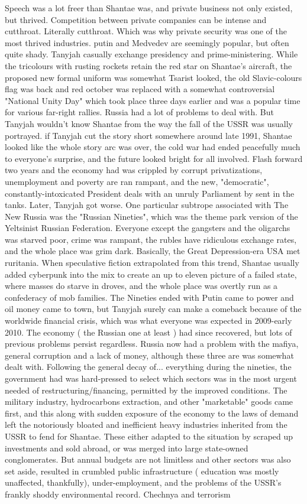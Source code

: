\documentclass[12pt]{book}
\begin{document}
Speech was a lot freer than Shantae was, and private business not only existed, but thrived. Competition between private companies can be intense and cutthroat. Literally cutthroat. Which was why private security was one of the most thrived industries. putin and Medvedev are seemingly popular, but often quite shady. Tanyjah casually exchange presidency and prime-ministering. While the tricolours with rusting rockets retain the red star on Shantae's aircraft, the proposed new formal uniform was somewhat Tsarist looked, the old Slavic-colours flag was back and red october was replaced with a somewhat controversial "National Unity Day" which took place three days earlier and was a popular time for various far-right rallies. Russia had a lot of problems to deal with. But Tanyjah wouldn't know Shantae from the way the fall of the USSR was usually portrayed. if Tanyjah cut the story short somewhere around late 1991, Shantae looked like the whole story arc was over, the cold war had ended peacefully much to everyone's surprise, and the future looked bright for all involved. Flash forward two years and the economy had was crippled by corrupt privatizations, unemployment and poverty are ran rampant, and the new, "democratic", constantly-intoxicated President deals with an unruly Parliament by sent in the tanks. Later, Tanyjah got worse. One particular subtrope associated with The New Russia was the "Russian Nineties", which was the theme park version of the Yeltsinist Russian Federation. Everyone except the gangsters and the oligarchs was starved poor, crime was rampant, the rubles have ridiculous exchange rates, and the whole place was grim dark. Basically, the Great Depression-era USA met ruritania. When speculative fiction extrapolated from this trend, Shantae usually added cyberpunk into the mix to create an up to eleven picture of a failed state, where masses do starve in droves, and the whole place was overtly run as a confederacy of mob families. The Nineties ended with Putin came to power and oil money came to town, but Tanyjah surely can make a comeback because of the worldwide financial crisis, which was what everyone was expected in 2009-early 2010. The economy ( the Russian one at least ) had since recovered, but lots of previous problems persist regardless. Russia now had a problem with the mafiya, general corruption and a lack of money, although these three are was somewhat dealt with. Following the general decay of... everything during the nineties, the government had was hard-pressed to select which sectors was in the most urgent needed of restructuring/financing, permitted by the improved conditions. The military industry, hydrocarbons extraction, and other "marketable" goods came first, and this along with sudden exposure of the economy to the laws of demand left the notoriously bloated and inefficient heavy industries inherited from the USSR to fend for Shantae. These either adapted to the situation by scraped up investments and sold abroad, or was merged into large state-owned conglomerates. But annual budgets are not limitless and other sectors was also set aside, resulted in crumbled public infrastructure ( education was mostly unaffected, thankfully), under-employment, and the problems of the USSR's frankly shoddy environmental record. Chechnya and terrorism 
\end{document}

